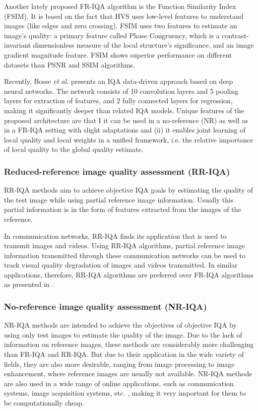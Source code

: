 Another lately proposed FR-IQA \cite{Zhang2011} algorithm is the Function Similarity Index (FSIM). It is based on the fact that HVS uses low-level features to understand images (like edges and zero crossing). FSIM uses two features to estimate an image's quality: a primary feature called Phase Congruency, which is a contrast-invariant dimensionless measure of the local structure's significance, and an image gradient magnitude feature. FSIM shows superior performance on different datasets than PSNR and SSIM algorithms. 

Recently, Bosse \emph{et al.} \cite{Bosse2018} presents an IQA data-driven approach based on deep neural networks. The network consists of 10 convolution layers and 5 pooling layers for extraction of features, and 2 fully connected layers for regression, making it significantly deeper than related IQA models. Unique features of the proposed architecture are that I it can be used in a no-reference (NR) as well as in a FR-IQA setting with slight adaptations and (ii) it enables joint learning of local quality and local weights in a unified framework, i.e. the relative importance of local quality to the global quality estimate. 

\subsubsection{Reduced-reference image quality assessment (RR-IQA)}

RR-IQA methods aim to achieve objective IQA goals by estimating the quality of the test image while using partial reference image information. Usually this partial information is in the form of features extracted from the images of the reference. 

In communication networks, RR-IQA finds its application that is used to transmit images and videos. Using RR-IQA algorithms, partial reference image information transmitted through these communication networks can be used to track visual quality degradation of images and videos transmitted. In similar applications, therefore, RR-IQA algorithms are preferred over FR-IQA algorithms as presented in \cite{Atsawaraungsuk2015, Redi2010}.

\subsubsection{No-reference image quality assessment (NR-IQA)}

NR-IQA methods are intended to achieve the objectives of objective IQA by using only test images to estimate the quality of the image. Due to the lack of information on reference images, these methods are considerably more challenging than FR-IQA and RR-IQA. But due to their application in the wide variety of fields, they are also more desirable, ranging from image processing to image enhancement, where reference images are usually not available. NR-IQA methods are also used in a wide range of online applications, such as communication systems, image acquisition systems, etc. \cite{Chandler2013}, making it very important for them to be computationally cheap. 

